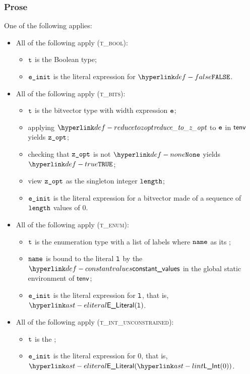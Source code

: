 \subsubsection{Prose}
One of the following applies:
\begin{itemize}
    \item All of the following apply (\textsc{t\_bool}):
    \begin{itemize}
        \item $\texttt{t}$ is the Boolean type;
        \item $\texttt{e\_init}$ is the literal expression for $\False$.
    \end{itemize}

    \item All of the following apply (\textsc{t\_bits}):
    \begin{itemize}
        \item $\texttt{t}$ is the bitvector type with width expression $\texttt{e}$;
        \item applying $\reducetozopt$ to $\texttt{e}$ in $\textsf{tenv}$ yields $\texttt{z\_opt}$;
        \item checking that $\texttt{z\_opt}$ is not $\None$ yields $\True$\ProseTerminateAs{\BaseValueNonStatic};
        \item view $\texttt{z\_opt}$ as the singleton integer $\texttt{length}$;
        \item $\texttt{e\_init}$ is the literal expression for a bitvector made of a sequence of $\texttt{length}$ values of $0$.
    \end{itemize}

    \item All of the following apply (\textsc{t\_enum}):
    \begin{itemize}
        \item $\texttt{t}$ is the enumeration type with a list of labels where $\texttt{name}$ as its \head;
        \item $\texttt{name}$ is bound to the literal $\texttt{l}$ by the $\constantvalues$ in the global static environment of $\textsf{tenv}$;
        \item $\texttt{e\_init}$ is the literal expression for $\texttt{l}$, that is, $\eliteral{\vl}$.
    \end{itemize}

    \item All of the following apply (\textsc{t\_int\_unconstrained}):
    \begin{itemize}
        \item $\texttt{t}$ is the \unconstrainedintegertype;
        \item $\texttt{e\_init}$ is the literal expression for $0$, that is, $\ELiteral(\lint(0))$.
    \end{itemize}


\end{itemize}
